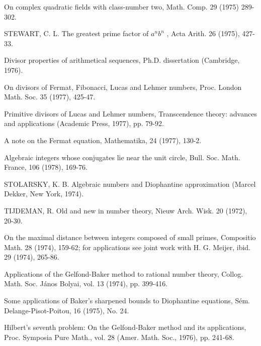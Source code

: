 \begin{hanglist}
    \item \hspace{1.5em} On complex quadratic fields with class-number two, Math. Comp. 29 (1975) 289-302.
    \item STEWART, C. L. The greatest prime factor of  $a^n b^n$ , Acta Arith. 26 (1975), 427-33.
    \item \hspace{1.5em} Divisor properties of arithmetical sequences, Ph.D. dissertation (Cambridge, 1976).
    \item \hspace{1.5em} On divisors of Fermat, Fibonacci, Lucas and Lehmer numbers, Proc. London Math. Soc. 35 (1977), 425-47.
    \item \hspace{1.5em} Primitive divisors of Lucas and Lehmer numbers, Transcendence theory: advances and applications (Academic Press, 1977), pp. 79-92.
    \item \hspace{1.5em} A note on the Fermat equation, Mathematika, 24 (1977), 130-2.
    \item Algebraic integers whose conjugates lie near the unit circle, Bull. Soc. Math. France, 106 (1978), 169-76.
    \item STOLARSKY, K. B. Algebraic numbers and Diophantine approximation (Marcel Dekker, New York, 1974).
    \item TIJDEMAN, R. Old and new in number theory, Nieuw Arch. Wisk. 20 (1972), 20-30.
    \item \hspace{1.5em} On the maximal distance between integers composed of small primes, Compositio Math. 28 (1974), 159-62; for applications see joint work with H. G. Meijer, ibid. 29 (1974), 265-86.
    \item \hspace{1.5em} Applications of the Gelfond-Baker method to rational number theory, Collog. Math. Soc. János Bolyai, vol. 13 (1974), pp. 399-416.
    \item \hspace{1.5em} Some applications of Baker's sharpened bounds to Diophantine equations, Sém. Delange-Pisot-Poitou, 16 (1975), No. 24.
    \item \hspace{1.5em} Hilbert's seventh problem: On the Gelfond-Baker method and its applications, Proc. Symposia Pure Math., vol. 28 (Amer. Math. Soc., 1976), pp. 241-68.

\end{hanglist}
